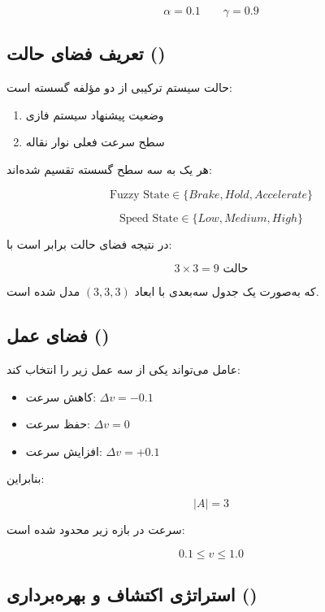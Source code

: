 \documentclass[a4paper, 10pt, twocolumn]{article}
\begin{document}
	\[
	\alpha = 0.1 \qquad \gamma = 0.9
	\]
	
	\vspace{1em}
	
	\subsection{تعریف فضای حالت ()}
	
	حالت سیستم ترکیبی از دو مؤلفه گسسته است:
	
	\begin{enumerate}
		\item وضعیت پیشنهاد سیستم فازی
		\item سطح سرعت فعلی نوار نقاله
	\end{enumerate}
	
	هر یک به سه سطح گسسته تقسیم شده‌اند:
	
	\[
	\text{Fuzzy State} \in \{Brake, Hold, Accelerate\}
	\]
	
	\[
	\text{Speed State} \in \{Low, Medium, High\}
	\]
	
	در نتیجه فضای حالت برابر است با:
	
	\[
	3 \times 3 = 9 \text{ حالت}
	\]
	
	که به‌صورت یک جدول سه‌بعدی با ابعاد $(3,3,3)$ مدل شده است.
	
	\vspace{1em}
	
	\subsection{فضای عمل ()}
	
	عامل می‌تواند یکی از سه عمل زیر را انتخاب کند:
	
	\begin{itemize}
		\item کاهش سرعت: $\Delta v = -0.1$
		\item حفظ سرعت: $\Delta v = 0$
		\item افزایش سرعت: $\Delta v = +0.1$
	\end{itemize}
	
	بنابراین:
	
	\[
	|A| = 3
	\]
	
	سرعت در بازه زیر محدود شده است:
	
	\[
	0.1 \leq v \leq 1.0
	\]
	
	\vspace{1em}
	
	\subsection{استراتژی اکتشاف و بهره‌برداری ()}
	
\end{document}
